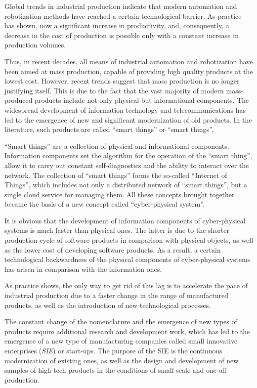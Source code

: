
{\actualityEn} Global trends in industrial production indicate that modern automation and robotization methods have reached a certain technological barrier. As practice has shown, now a significant increase in productivity, and, consequently, a decrease in the cost of production is possible only with a constant increase in production volumes.

Thus, in recent decades, all means of industrial automation and robotization have been aimed at mass production, capable of providing high quality products at the lowest cost. However, recent trends suggest that mass production is no longer justifying itself. This is due to the fact that the vast majority of modern mass-produced products include not only physical but informational components. The widespread development of information technology and telecommunications has led to the emergence of new and significant modernization of old products. In the literature, such products are called ``smart things'' or ``smart things''.

``Smart things'' are a collection of physical and informational components. Information components set the algorithm for the operation of the ``smart thing'', allow it to carry out constant self-diagnostics and the ability to interact over the network. The collection of ``smart things'' forms the so-called ``Internet of Things'', which includes not only a distributed network of ``smart things'', but a single cloud service for managing them. All these concepts brought together became the basis of a new concept called ``cyber-physical system''.

It is obvious that the development of information components of cyber-physical systems is much faster than physical ones. The latter is due to the shorter production cycle of software products in comparison with physical objects, as well as the lower cost of developing software products. As a result, a certain technological backwardness of the physical components of cyber-physical systems has arisen in comparison with the information ones.

As practice shows, the only way to get rid of this lag is to accelerate the pace of industrial production due to a faster change in the range of manufactured products, as well as the introduction of new technological processes.

The constant change of the nomenclature and the emergence of new types of products require additional research and development work, which has led to the emergence of a new type of manufacturing companies called small innovative enterprises (\textit {SIE}) or start-ups. The purpose of the SIE is the continuous modernization of existing ones, as well as the design and development of new samples of high-tech products in the conditions of small-scale and one-off production.

